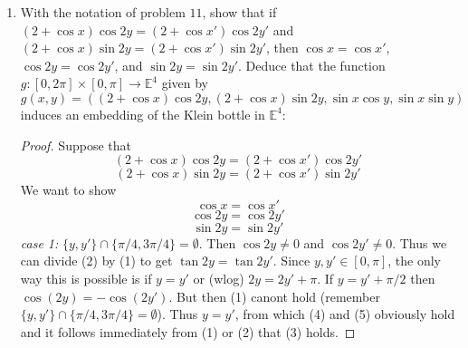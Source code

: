 \documentclass{book}
\begin{document}
\begin{enumerate}[(1)]
\begin{proof}
            \par In summary we have shown that any points that $f$ identifies to each other must lie on the boundary of the square; and that $f$ identifies the four corners of the square to one point; and $f$ identifies points on the top and bottom sides in pairs, where the point with $x$-coordinate $x$ on the top is identified with the point with $x$-coordinate $2\pi-x$ on the bottom; and finally $f$ identifies points on the left and right sides in pairs, where points with the same $y$-coordinate are identified to each other.

            \par It follows that the identification space is the Klein bottle.
        \end{proof}

    \item With the notation of problem $11$, show that if $(2+\cos x)\cos 2y=(2+\cos x')\cos 2y'$ and $(2+\cos x)\sin 2y=(2+\cos x')\sin 2y'$, then $\cos x=\cos x'$, $\cos 2y=\cos 2y'$, and $\sin 2y=\sin 2y'$.  Deduce that the function $g:[0,2\pi]\times[0,\pi]\rightarrow \mathbb E^4$ given by $g(x,y)=((2+\cos x)\cos 2y, (2+\cos x)\sin 2y, \sin x\cos y, \sin x\sin y)$ induces an embedding of the Klein bottle in $\mathbb E^4$: 
        \begin{proof} Suppose that\setcounter{equation}{0}
            \begin{equation}
                (2+\cos x)\cos 2y=(2+\cos x')\cos 2y'
            \end{equation}
            \begin{equation}
                (2+\cos x)\sin 2y=(2+\cos x')\sin 2y'
            \end{equation}
            We want to show
            \begin{equation}
                \cos x=\cos x'
            \end{equation}
            \begin{equation}
                \cos 2y=\cos 2y'
            \end{equation}
            \begin{equation}
                \sin 2y=\sin 2y'
            \end{equation}
            {\it case 1:} $\{y,y'\}\cap\{\pi/4,3\pi/4\}=\emptyset$.  Then $\cos 2y\not=0$ and $\cos 2y'\not=0$.  Thus we can divide (2) by (1) to get $\tan 2y=\tan 2y'$.  Since $y,y'\in[0,\pi]$, the only way this is possible is if $y=y'$ or (wlog) $2y=2y'+\pi$.  If $y=y'+\pi/2$ then $\cos(2y)=-\cos(2y')$.  But then (1) canont hold (remember $\{y,y'\}\cap\{\pi/4,3\pi/4\}=\emptyset$). Thus $y=y'$, from which (4) and (5) obviously hold and it follows immediately from (1) or (2) that (3) holds.


\end{proof}
\end{enumerate}
\end{document}
